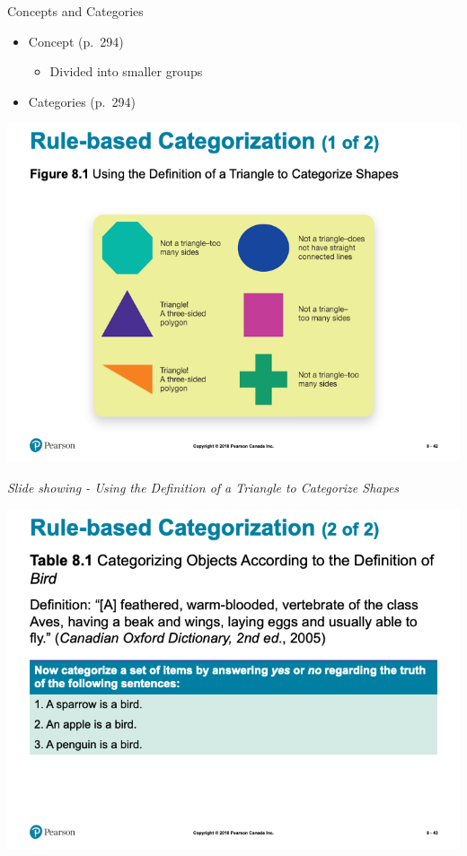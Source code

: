 \documentclass[
]{book}
\providecommand{\tightlist}{%
  \setlength{\itemsep}{0pt}\setlength{\parskip}{0pt}}
\begin{document}
Concepts and Categories

\begin{itemize}
\tightlist
\item
  Concept (p.~294)

  \begin{itemize}
  \tightlist
  \item
    Divided into smaller groups\\
  \end{itemize}
\item
  Categories (p.~294)
\end{itemize}

\includegraphics{assets/unit_1/slide_42.png}

\emph{Slide showing - Using the Definition of a Triangle to Categorize Shapes}

\includegraphics{assets/unit_1/slide_43.png}
\end{document}
